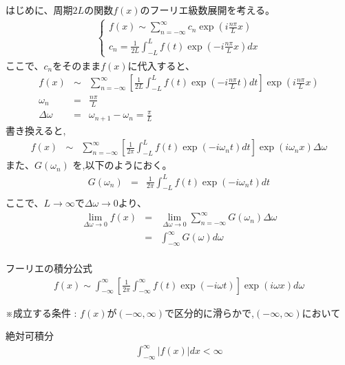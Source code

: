 \documentclass[a4paper]{jsarticle}
\begin{document}
はじめに、周期$2L$の関数$f\left(x\right)$のフーリエ級数展開を考える。
\begin{eqnarray*}
    \begin{cases}
        \displaystyle f\left(x\right) \sim \sum^{\infty}_{n=-\infty} c_n \exp{\left(i \frac{n\pi}{L}x\right)} \\
        \displaystyle c_n = \displaystyle\frac{1}{2L}\int^{L}_{-L}f\left(t\right) \exp{\left(-i \frac{n\pi}{L}x\right)} dx
    \end{cases}
\end{eqnarray*}
ここで、$c_n$をそのまま$f\left(x\right)$に代入すると、
\begin{eqnarray*}
    f\left(x\right) &\sim& \sum^{\infty}_{n=-\infty} \left[ \frac{1}{2L}\int^{L}_{-L}f\left(t\right) \exp{\left(-i \frac{n\pi}{L}t\right)} dt\right] \exp{\left(i \frac{n\pi}{L}x\right)}\\
    \omega_n &=& \frac{n\pi}{L}\\
    \Delta \omega &=& \omega_{n+1} -\omega_n = \frac{\pi}{L}
\end{eqnarray*}
書き換えると,
\begin{eqnarray*}
    f\left(x\right) &\sim& \sum^{\infty}_{n=-\infty} \left[ \frac{1}{2\pi}\int^{L}_{-L}f\left(t\right) \exp{\left(-i \omega_n  t\right)} dt\right] \exp{\left(i \omega_n x \right)} \Delta \omega
\end{eqnarray*}
また、$G\left(\omega_n\right)$ を,以下のようにおく。
\begin{eqnarray*}
    G\left(\omega_n\right) &=&  \frac{1}{2\pi}\int^{L}_{-L}f\left(t\right) \exp{\left(-i \omega_n t \right)} dt\\
\end{eqnarray*}
ここで、$L \rightarrow \infty$で$\Delta \omega \rightarrow 0$より、
\begin{eqnarray*}
    \lim_{\Delta \omega \rightarrow 0} f\left(x\right)
    &=& \lim_{\Delta \omega \rightarrow 0} \sum_{n=-\infty}^{\infty} G\left(\omega_n\right) \Delta \omega\\
    &=& \int^{\infty}_{-\infty} G\left(\omega\right) d\omega\\
\end{eqnarray*}
\begin{itembox}[l]{フーリエの積分公式}
    \begin{eqnarray*}
        f\left(x\right) \sim \int^{\infty}_{-\infty}\left[ \frac{1}{2\pi} \int^{\infty}_{-\infty}f\left(t\right)\exp\left(-i \omega t\right)\right] \exp\left(i \omega x\right) d\omega
    \end{eqnarray*}
    \begin{center}
        ※成立する条件 : $f\left(x\right)$が$\left(-\infty,\infty\right)$で区分的に滑らかで,$\left(-\infty,\infty\right)$において\\
    \end{center}
\end{itembox}
\begin{itembox}[l]{絶対可積分}
    \begin{eqnarray*}
        \int^{\infty}_{-\infty}\left| f\left(x\right)\right| dx < \infty\\
    \end{eqnarray*}
\end{itembox}
\end{document}
